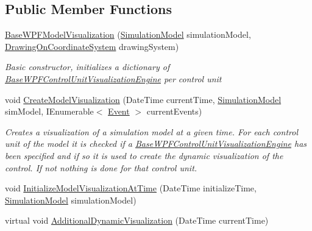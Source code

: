 \subsection*{Public Member Functions}
\begin{DoxyCompactItemize}
\item 
\hyperlink{class_simulation_w_p_f_visualization_tools_1_1_base_w_p_f_model_visualization_a512f341736e2efc3943852658fe71d30}{Base\+W\+P\+F\+Model\+Visualization} (\hyperlink{class_simulation_core_1_1_simulation_classes_1_1_simulation_model}{Simulation\+Model} simulation\+Model, \hyperlink{class_w_p_f_visualization_base_1_1_drawing_on_coordinate_system}{Drawing\+On\+Coordinate\+System} drawing\+System)
\begin{DoxyCompactList}\small\item\em Basic constructor, initializes a dictionary of \hyperlink{class_simulation_w_p_f_visualization_tools_1_1_base_w_p_f_control_unit_visualization_engine}{Base\+W\+P\+F\+Control\+Unit\+Visualization\+Engine} per control unit \end{DoxyCompactList}\item 
void \hyperlink{class_simulation_w_p_f_visualization_tools_1_1_base_w_p_f_model_visualization_ad476a50d53da146f94d2333f3910a46e}{Create\+Model\+Visualization} (Date\+Time current\+Time, \hyperlink{class_simulation_core_1_1_simulation_classes_1_1_simulation_model}{Simulation\+Model} sim\+Model, I\+Enumerable$<$ \hyperlink{class_simulation_core_1_1_h_c_c_m_elements_1_1_event}{Event} $>$ current\+Events)
\begin{DoxyCompactList}\small\item\em Creates a visualization of a simulation model at a given time. For each control unit of the model it is checked if a \hyperlink{class_simulation_w_p_f_visualization_tools_1_1_base_w_p_f_control_unit_visualization_engine}{Base\+W\+P\+F\+Control\+Unit\+Visualization\+Engine} has been specified and if so it is used to create the dynamic visualization of the control. If not nothing is done for that control unit. \end{DoxyCompactList}\item 
void \hyperlink{class_simulation_w_p_f_visualization_tools_1_1_base_w_p_f_model_visualization_a9a4d7e507c3bbc540f303c84ea25891d}{Initialize\+Model\+Visualization\+At\+Time} (Date\+Time initialize\+Time, \hyperlink{class_simulation_core_1_1_simulation_classes_1_1_simulation_model}{Simulation\+Model} simulation\+Model)
\item 
virtual void \hyperlink{class_simulation_w_p_f_visualization_tools_1_1_base_w_p_f_model_visualization_a656e8fad7f6fb923e71f78fee639c124}{Additional\+Dynamic\+Visualization} (Date\+Time current\+Time)

\end{DoxyCompactItemize}
